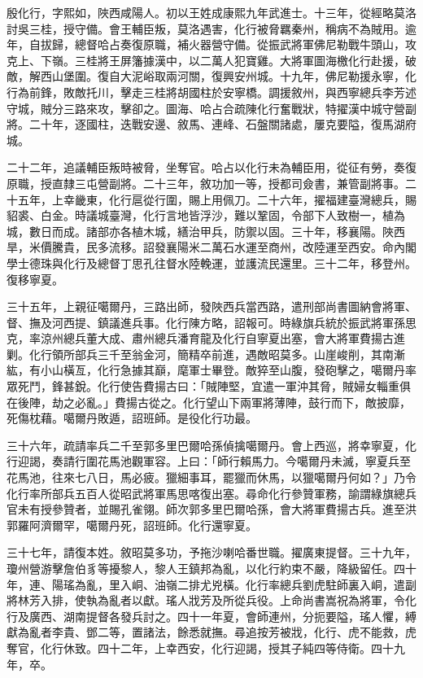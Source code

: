 \begin{pinyinscope}
殷化行，字熙如，陜西咸陽人。初以王姓成康熙九年武進士。十三年，從經略莫洛討吳三桂，授守備。會王輔臣叛，莫洛遇害，化行被脅羈秦州，稱病不為賊用。逾年，自拔歸，總督哈占奏復原職，補火器營守備。從振武將軍佛尼勒戰牛頭山，攻克上、下嶺。三桂將王屏籓據漢中，以二萬人犯寶雞。大將軍圖海檄化行赴援，破敵，解西山堡圍。復自大泥峪取兩河關，復興安州城。十九年，佛尼勒援永寧，化行為前鋒，敗敵托川，擊走三桂將胡國柱於安寧橋。調援敘州，與西寧總兵李芳述守城，賊分三路來攻，擊卻之。圖海、哈占合疏陳化行奮戰狀，特擢漢中城守營副將。二十年，逐國柱，迭戰安邊、敘馬、連峰、石盤關諸處，屢克要隘，復馬湖府城。

二十二年，追議輔臣叛時被脅，坐奪官。哈占以化行未為輔臣用，從征有勞，奏復原職，授直隸三屯營副將。二十三年，敘功加一等，授都司僉書，兼管副將事。二十五年，上幸畿東，化行扈從行圍，賜上用佩刀。二十六年，擢福建臺灣總兵，賜貂裘、白金。時議城臺灣，化行言地皆浮沙，難以鞏固，令部下人致樹一，植為城，數日而成。諸部亦各植木城，繕治甲兵，防禦以固。三十年，移襄陽。陜西旱，米價騰貴，民多流移。詔發襄陽米二萬石水運至商州，改陸運至西安。命內閣學士德珠與化行及總督丁思孔往督水陸輓運，並護流民還里。三十二年，移登州。復移寧夏。

三十五年，上親征噶爾丹，三路出師，發陜西兵當西路，遣刑部尚書圖納會將軍、督、撫及河西提、鎮議進兵事。化行陳方略，詔報可。時綠旗兵統於振武將軍孫思克，率涼州總兵董大成、肅州總兵潘育龍及化行自寧夏出塞，會大將軍費揚古進剿。化行領所部兵三千至翁金河，簡精卒前進，遇敵昭莫多。山崖峻削，其南漸紘，有小山橫亙，化行急據其巔，麾軍士畢登。敵猝至山腹，發砲擊之，噶爾丹率眾死鬥，鋒甚銳。化行使告費揚古曰：「賊陣堅，宜遣一軍沖其脅，賊婦女輜重俱在後陣，劫之必亂。」費揚古從之。化行望山下兩軍將薄陣，鼓行而下，敵披靡，死傷枕藉。噶爾丹敗遁，詔班師。是役化行功最。

三十六年，疏請率兵二千至郭多里巴爾哈孫偵擒噶爾丹。會上西巡，將幸寧夏，化行迎謁，奏請行圍花馬池觀軍容。上曰：「師行賴馬力。今噶爾丹未滅，寧夏兵至花馬池，往來七八日，馬必疲。獵細事耳，罷獵而休馬，以獵噶爾丹何如？」乃令化行率所部兵五百人從昭武將軍馬思喀復出塞。尋命化行參贊軍務，諭謂綠旗總兵官未有授參贊者，並賜孔雀翎。師次郭多里巴爾哈孫，會大將軍費揚古兵。進至洪郭羅阿濟爾罕，噶爾丹死，詔班師。化行還寧夏。

三十七年，請復本姓。敘昭莫多功，予拖沙喇哈番世職。擢廣東提督。三十九年，瓊州營游擊詹伯豸等擾黎人，黎人王鎮邦為亂，以化行約束不嚴，降級留任。四十年，連、陽瑤為亂，里入峒、油嶺二排尤兇橫。化行率總兵劉虎駐師裏入峒，遣副將林芳入排，使執為亂者以獻。瑤人戕芳及所從兵役。上命尚書嵩祝為將軍，令化行及廣西、湖南提督各發兵討之。四十一年夏，會師連州，分扼要隘，瑤人懼，縛獻為亂者李貴、鄧二等，置諸法，餘悉就撫。尋追按芳被戕，化行、虎不能救，虎奪官，化行休致。四十二年，上幸西安，化行迎謁，授其子純四等侍衛。四十九年，卒。


\end{pinyinscope}
